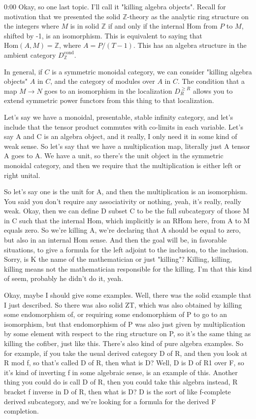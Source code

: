\begin{unfinished}{0:00}
Okay, so one last topic. I'll call it "killing algebra objects". Recall for motivation that we presented the solid $\mathbb{Z}$-theory as the analytic ring structure on the integers where $M$ is in solid $\mathbb{Z}$ if and only if the internal Hom from $P$ to $M$, shifted by -1, is an isomorphism. This is equivalent to saying that $\mathrm{Hom}(A, M) = \mathbb{Z}$, where $A = P / (T-1)$. This has an algebra structure in the ambient category $D_{\mathbb{Z}}^{\mathrm{cond}}$. 

In general, if $C$ is a symmetric monoidal category, we can consider "killing algebra objects" $A$ in $C$, and the category of modules over $A$ in $C$. The condition that a map $M \to N$ goes to an isomorphism in the localization $D^{\geq R}_R$ allows you to extend symmetric power functors from this thing to that localization.

Let's say we have a monoidal, presentable, stable infinity category, and let's include that the tensor product commutes with co-limits in each variable. Let's say A and C is an algebra object, and it really, I only need it in some kind of weak sense. So let's say that we have a multiplication map, literally just A tensor A goes to A. We have a unit, so there's the unit object in the symmetric monoidal category, and then we require that the multiplication is either left or right unital.

So let's say one is the unit for A, and then the multiplication is an isomorphism. You said you don't require any associativity or nothing, yeah, it's really, really weak. Okay, then we can define D subset C to be the full subcategory of those M in C such that the internal Hom, which implicitly is an RHom here, from A to M equals zero. So we're killing A, we're declaring that A should be equal to zero, but also in an internal Hom sense. And then the goal will be, in favorable situations, to give a formula for the left adjoint to the inclusion, to the inclusion. Sorry, is K the name of the mathematician or just "killing"? Killing, killing, killing means not the mathematician responsible for the killing. I'm that this kind of seem, probably he didn't do it, yeah.

Okay, maybe I should give some examples. Well, there was the solid example that I just described. So there was also solid ZT, which was also obtained by killing some endomorphism of, or requiring some endomorphism of P to go to an isomorphism, but that endomorphism of P was also just given by multiplication by some element with respect to the ring structure on P, so it's the same thing as killing the cofiber, just like this. There's also kind of pure algebra examples. So for example, if you take the usual derived category D of R, and then you look at R mod f, so that's called D of R, then what is D? Well, D is D of R1 over F, so it's kind of inverting f in some algebraic sense, is an example of this. Another thing you could do is call D of R, then you could take this algebra instead, R bracket f inverse in D of R, then what is D? D is the sort of like f-complete derived subcategory, and we're looking for a formula for the derived F completion.


\end{unfinished}
